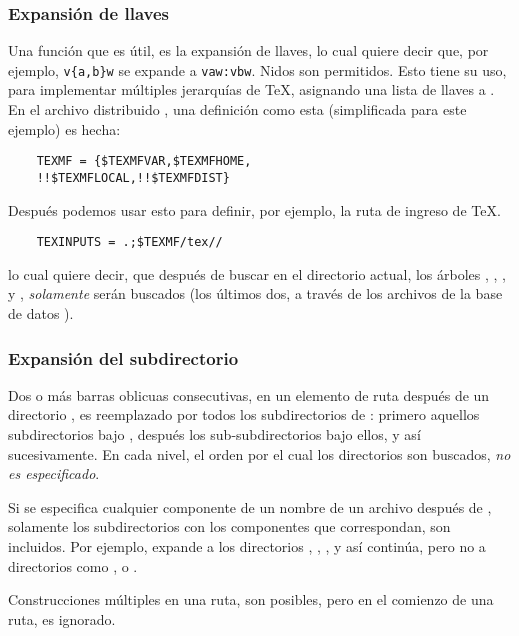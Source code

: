 \documentclass{article}
\begin{document}
\subsubsection{Expansión de llaves}
\label{sec:brace-expansion}

Una función que es útil, es la expansión de 
llaves, lo cual quiere decir que, por ejemplo,
\verb+v{a,b}w+ se expande a \verb+vaw:vbw+. Nidos son
permitidos. Esto tiene su uso, para implementar múltiples
jerarquías de \TeX{}, asignando una lista de llaves a
.
En el archivo distribuido , una definición
como esta (simplificada para este ejemplo) es hecha:
\begin{verbatim}
	TEXMF = {$TEXMFVAR,$TEXMFHOME,
	!!$TEXMFLOCAL,!!$TEXMFDIST}
\end{verbatim}
Después podemos usar esto para definir, por ejemplo, la ruta de
ingreso de \TeX{}. 
\begin{verbatim}
	TEXINPUTS = .;$TEXMF/tex//
\end{verbatim}

lo cual quiere decir, que después de buscar en el directorio
actual, los árboles ,
, , y
, \emph{solamente} serán buscados (los
últimos dos, a través de los archivos de la base de datos
). 

\subsubsection{Expansión del subdirectorio}
\label{sec:subdirectory-expnsion}

Dos o más barras oblicuas consecutivas, en un elemento de ruta después
de un directorio , es reemplazado por todos los subdirectorios
de : primero aquellos subdirectorios bajo , después los
sub-subdirectorios bajo ellos, y así sucesivamente. En cada nivel, el
orden por el cual los directorios son buscados, \emph{no es
especificado}.

Si se especifica cualquier componente de un nombre de un archivo
después de \samp{//}, solamente los subdirectorios con los componentes
que correspondan, son incluidos. Por ejemplo,  expande a
los directorios , , , y así
continúa, pero no a directorios como , o .

Construcciones múltiples \samp{//} en una ruta, son posibles, pero
\samp{//} en el comienzo de una ruta, es ignorado. 
\end{document}
